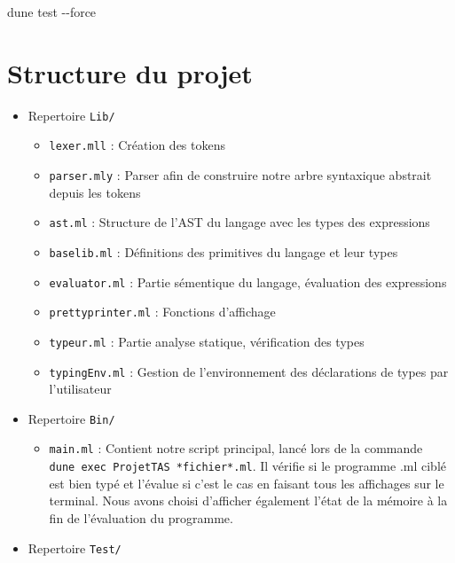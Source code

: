\documentclass[
  12pt,
]{article}
\newenvironment{Shaded}{}{}
\newcommand{\AttributeTok}[1]{\textcolor[rgb]{0.49,0.56,0.16}{#1}}
\newcommand{\ExtensionTok}[1]{#1}
\newcommand{\NormalTok}[1]{#1}
\providecommand{\tightlist}{%
  \setlength{\itemsep}{0pt}\setlength{\parskip}{0pt}}
\begin{document}
\begin{Shaded}
\begin{Highlighting}[]
    \ExtensionTok{dune}\NormalTok{ test }\AttributeTok{{-}{-}force}
\end{Highlighting}
\end{Shaded}

\newpage

\section{Structure du projet}\label{structure-du-projet}

\begin{itemize}
\tightlist
\item
  Repertoire \texttt{Lib/}

  \begin{itemize}
  \tightlist
  \item
    \texttt{lexer.mll} : Création des tokens
  \item
    \texttt{parser.mly} : Parser afin de construire notre arbre
    syntaxique abstrait depuis les tokens
  \item
    \texttt{ast.ml} : Structure de l'AST du langage avec les types des
    expressions
  \item
    \texttt{baselib.ml} : Définitions des primitives du langage et leur
    types
  \item
    \texttt{evaluator.ml} : Partie sémentique du langage, évaluation des
    expressions
  \item
    \texttt{prettyprinter.ml} : Fonctions d'affichage
  \item
    \texttt{typeur.ml} : Partie analyse statique, vérification des types
  \item
    \texttt{typingEnv.ml} : Gestion de l'environnement des déclarations
    de types par l'utilisateur
  \end{itemize}
\item
  Repertoire \texttt{Bin/}

  \begin{itemize}
  \tightlist
  \item
    \texttt{main.ml} : Contient notre script principal, lancé lors de la
    commande \texttt{dune\ exec\ ProjetTAS\ *fichier*.ml}. Il vérifie si
    le programme .ml ciblé est bien typé et l'évalue si c'est le cas en
    faisant tous les affichages sur le terminal. Nous avons choisi
    d'afficher également l'état de la mémoire à la fin de l'évaluation
    du programme.
  \end{itemize}
\item
  Repertoire \texttt{Test/}


\end{itemize}
\end{document}
